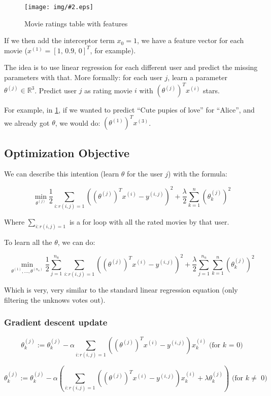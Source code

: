 \documentclass[10pt]{extarticle}
\newcommand{\stdfig}[3]{
    \begin{figure}
    \centering
    \texttt{[image: img/\#2.eps]}
    \caption{#3}
    \label{fig:#2}
    \end{figure}
}
\begin{document}
\stdfig{11cm}{movie_ratings_table_with_features}{Movie ratings table with features}

If we then add the interceptor term $x_0 = 1$, we have a feature vector
for each movie ($x^{(1)} = [1, \, 0.9, \,  0]^T$, for example). \bigskip

The idea is to use linear regression for each different user and predict
the missing parameters with that. More formally: for each user $j$,
learn a parameter $\theta^{(j)} \in \mathbb{R}^3$. Predict user $j$ as
rating movie $i$ with $(\theta^{(j)})^Tx^{(i)}$ stars. \smallskip

For example, in \cref{fig:movie_ratings_table_with_features}, if we
wanted to predict ``Cute pupies of love'' for ``Alice'', and we already
got $\theta$, we would do: $(\theta^{(1)})^Tx^{(3)}$. \smallskip

\subsection{Optimization Objective}\label{optimization-objective}

We can describe this intention (learn $\theta$ for the user $j$) with
the formula:

\[ \min_{\theta^{(j)}}  \frac{1}{2} \sum_{i:r(i, j)=1} ((\theta^{(j)})^Tx^{(i)} - y^{(i,j)})^2 + \frac{\lambda}{2} \sum_{k=1}^n(\theta_k^{(j)})^2 \]

Where $\sum_{i:r(i, j)=1} $ is a for loop with all the rated movies by
that user. \smallskip

To learn all the $\theta$, we can do:

\[ \min_{\theta^{(1)}, \dots, \theta^{(n_u)}}  \frac{1}{2} \sum_{j=1}^{n_u} \sum_{i:r(i, j)=1} ((\theta^{(j)})^Tx^{(i)} - y^{(i,j)})^2 + \frac{\lambda}{2} \sum_{j=1}^{n_u} \sum_{k=1}^n(\theta_k^{(j)})^2 \]

Which is very, very similar to the standard linear regression equation
(only filtering the unknows votes out).

\subsubsection{Gradient descent update}\label{gradient-descent-update}

\[ \theta_k^{(j)} := \theta_k^{(j)} - \alpha \sum_{i:r(i, j)=1} \left( (\theta^{(j)})^Tx^{(i)} - y^{(i,j)}\right) x_k^{(i)} \,\, \text{(for $k$ = 0)} \]

\[ \theta_k^{(j)} := \theta_k^{(j)} - \alpha \left( \sum_{i:r(i, j)=1} \left( (\theta^{(j)})^Tx^{(i)} - y^{(i,j)}\right) x_k^{(i)} + \lambda\theta_k^{(j)} \right) \,\, \text{(for $k \neq$ 0)} \]
\end{document}
